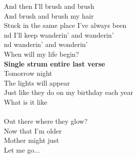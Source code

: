 And then I'll brush and brush\\
And brush and brush my hair\\
Stuck in the same place I've always been\\
nd I'll keep wanderin' and wanderin'\\
nd wanderin' and wonderin'\\
When will my life begin?\\
\textbf{Single strum entire last verse}\\
Tomorrow night\\
The lights will appear\\
Just like they do on my birthday each year\\
What is it like\\
 \\
Out there where they glow?\\
Now that I'm older\\
Mother might just\\
Let me go...\\
